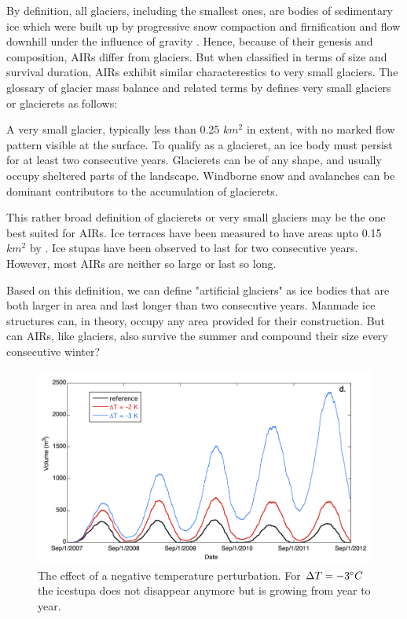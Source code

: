 By definition, all glaciers, including the smallest ones, are bodies of sedimentary ice which were built up by
progressive snow compaction and firnification and flow downhill under the influence of gravity
\cite{benndouglasiGlaciersGlaciation2014}. Hence, because of their genesis and composition, AIRs differ from
glaciers. But when classified in terms of size and survival duration, AIRs exhibit similar characterestics to
very small glaciers. The glossary of glacier mass balance and related terms by
\citet{cogleyGlossaryGlacierMass2010} defines very small glaciers or glacierets as follows:

\begin{thesis_quotation}
  A very small glacier, typically less than 0.25 $km^2$ in extent, with no marked flow pattern
  visible at the surface. To qualify as a glacieret, an ice body must persist for at least two consecutive
  years. Glacierets can be of any shape, and usually occupy sheltered parts of the landscape. Windborne snow and
  avalanches can be dominant contributors to the accumulation of glacierets. 
\end{thesis_quotation}

This rather broad definition of glacierets or very small glaciers may be the one best suited for AIRs. Ice
terraces have been measured to have areas upto 0.15 $km^2$ by
\citet{nusserSociohydrologyArtificialGlaciers2019}. Ice stupas have been observed to last for two consecutive
years. However, most AIRs are neither so large or last so long.

Based on this definition, we can define "artificial glaciers" as ice bodies that are both larger in area and
last longer than two consecutive years. Manmade ice structures can, in theory, occupy any area provided for
their construction. But can AIRs, like glaciers, also survive the summer and compound their size every
consecutive winter? 

\begin{figure}[htb]
  \centering
	\includegraphics[width=12 cm]{figs/PIR_example.png}
  \caption{The effect of a negative temperature perturbation. For $\Delta T = -3 ^{\circ} C$ the icestupa does
  not disappear anymore but is growing from year to year.}
\label{fig:PIR}
\end{figure}

